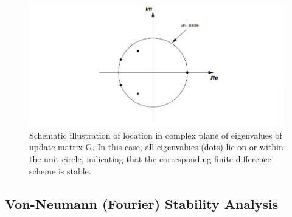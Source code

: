 \begin{figure}
    \centering
    \includegraphics[width = \linewidth]{Images/complex_plane_eigenvalues.png}
    \caption{Schematic illustration of location in complex plane of eigenvalues of update matrix G. In this case, all eigenvalues (dots) lie on or within the unit circle, indicating that the corresponding finite difference scheme is stable.}
    \label{fig:enter-label}
\end{figure}

\subsection{Von-Neumann (Fourier) Stability Analysis}

